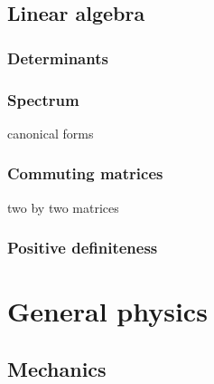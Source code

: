 \documentclass{../../large}
\begin{document}
\chapter{Linear algebra}


\section{Determinants}

\section{Spectrum}
canonical forms

\section{Commuting matrices}
two by two matrices

\section{Positive definiteness}










\part{General physics}
\setcounter{chapter}{0}





\chapter{Mechanics}
\end{document}
